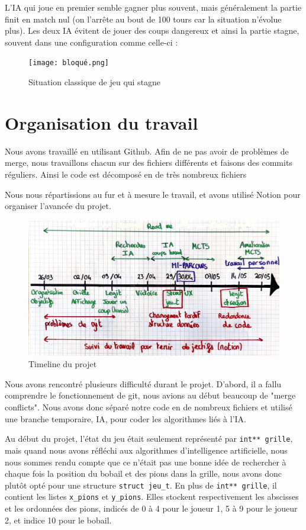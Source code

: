 \documentclass{article}
\begin{document}
L'IA qui joue en premier semble gagner plus souvent, mais généralement la partie finit en match nul (on l'arrête au bout de 100 tours car la situation n'évolue plus). Les deux IA évitent de jouer des coups dangereux et ainsi la partie stagne, souvent dans une configuration comme celle-ci :

\begin{figure}[H]
    \centering
    \texttt{[image: bloqué.png]}
    \caption{Situation classique de jeu qui stagne}
    \label{fig:3}
\end{figure}



\section{Organisation du travail}

Nous avons travaillé en utilisant Github. Afin de ne pas avoir de problèmes de merge, nous travaillons chacun sur des fichiers différents et faisons des commits réguliers. Ainsi le code est décomposé en de très nombreux fichiers

Nous nous répartissions au fur et à mesure le travail, et avons utilisé Notion pour organiser l'avancée du projet.

\begin{figure}[H]
    \centering
    \includegraphics[width=0.7\linewidth]{timeline.jpg}
    \caption{Timeline du projet}
    \label{fig:3}
\end{figure}


Nous avons rencontré plusieurs difficulté durant le projet. D'abord, il a fallu comprendre le fonctionnement de git, nous avions au début beaucoup de "merge conflicts". Nous avons donc séparé notre code en de nombreux fichiers et utilisé une branche temporaire, IA, pour coder les algorithmes liés à l'IA.

Au début du projet, l'état du jeu était seulement représenté par {\tt int** grille}, mais quand nous avons réfléchi aux algorithmes d'intelligence artificielle, nous nous sommes rendu compte que ce n'était pas une bonne idée de rechercher à chaque fois la position du bobail et des pions dans la grille, nous avons donc plutôt opté pour une structure {\tt struct jeu\_t}. En plus de {\tt int** grille}, il contient les listes {\tt x\_pions} et {\tt y\_pions}. Elles stockent respectivement les abscisses et les ordonnées des pions, indicés de 0 à 4 pour le joueur 1, 5 à 9 pour le joueur 2, et indice 10 pour le bobail.
\end{document}
